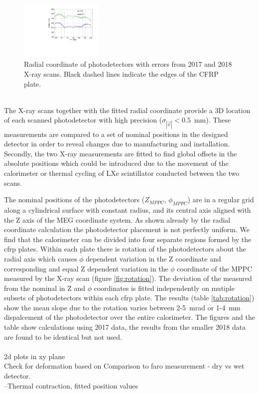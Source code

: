 \begin{figure}[h]
\includegraphics[width=4cm]{plots/2018/cRadius_1718}
\caption{ Radial coordinate of photodetectors with errors from 2017 and 2018
X-ray scans.  Black dashed lines indicate the edges of the CFRP plate.}
\label{fig:radiuscalculation} 
\end{figure}



 \\ 
The X-ray scans together with the fitted radial coordinate
provide a 3D location of each scanned photodetector  with high
precision ($\sigma_{|\vec{x}|}<0.5$~mm).  These measurements are
compared to a set of nominal positions in the designed detector
in order to reveal changes due to manufacturing and installation.
Secondly, the two X-ray  measurements are fitted to find global
offsets in the absolute positions which could be introduced due
to the movement of the calorimeter or thermal cycling of LXe
scintillator conducted between the two scans.

The nominal positions of the photodetectors
($Z_{MPPC}$, $\phi_{MPPC}$) are in a regular grid along
a cylindrical surface with constant radius, and its central
axis aligned with the Z axis of the MEG coordinate system.  
As shown already by the radial coordinate calculation
the photodetector placement is not perfectly uniform.
We find that the calorimeter can be divided into four separate
regions formed by the cfrp plates. Within each plate
there is rotation of the photodetectors about the radial
axis which causes $\phi$ dependent variation in the 
Z coordinate and corresponding and equal 
Z dependent variation in the $\phi$ coordinate
of the MPPC measured by the X-ray scan 
(figure \ref{fig:rotation}). The deviation of 
the measured from the 
nominal in Z and $\phi$ coordinates is fitted 
independently on mutiple subsets of photodetectors 
within each cfrp plate. The results (table \ref{tab:rotation})
show the mean slope due to the rotation varies between
2-5~mrad  or 1-4~mm dispalcement of the photodetector
over the entire calorimeter. The figures and the table 
show calculations using 2017 data, the results from 
the smaller 2018 data are found to be identical but not used.
\\
\\
\noindent 2d plots in xy plane \\
Check for deformation based on Comparison to faro measurement - dry vs wet detector.\\
--Thermal contraction, fitted position values\\

